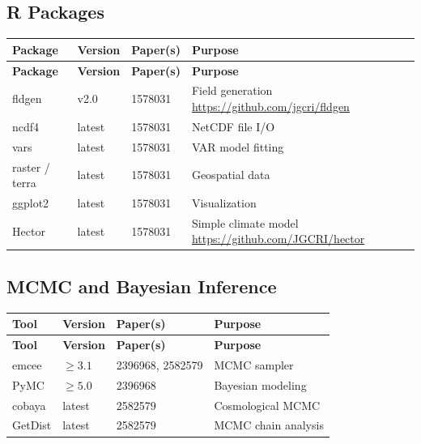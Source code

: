 \documentclass[11pt,a4paper]{article}
\begin{document}
\subsection{R Packages}

\begin{longtable}{p{3.5cm} p{2cm} p{3cm} p{5cm}}
\toprule
\textbf{Package} & \textbf{Version} & \textbf{Paper(s)} & \textbf{Purpose} \\
\midrule
\endfirsthead
\toprule
\textbf{Package} & \textbf{Version} & \textbf{Paper(s)} & \textbf{Purpose} \\
\midrule
\endhead
fldgen & v2.0 & 1578031 & Field generation \newline \url{https://github.com/jgcri/fldgen} \\
\midrule
ncdf4 & latest & 1578031 & NetCDF file I/O \\
\midrule
vars & latest & 1578031 & VAR model fitting \\
\midrule
raster / terra & latest & 1578031 & Geospatial data \\
\midrule
ggplot2 & latest & 1578031 & Visualization \\
\midrule
Hector & latest & 1578031 & Simple climate model \newline \url{https://github.com/JGCRI/hector} \\
\bottomrule
\end{longtable}


\subsection{MCMC and Bayesian Inference}

\begin{longtable}{p{3.5cm} p{2cm} p{3cm} p{5cm}}
\toprule
\textbf{Tool} & \textbf{Version} & \textbf{Paper(s)} & \textbf{Purpose} \\
\midrule
\endfirsthead
\toprule
\textbf{Tool} & \textbf{Version} & \textbf{Paper(s)} & \textbf{Purpose} \\
\midrule
\endhead
emcee & $\geq 3.1$ & 2396968, 2582579 & MCMC sampler \\
\midrule
PyMC & $\geq 5.0$ & 2396968 & Bayesian modeling \\
\midrule
cobaya & latest & 2582579 & Cosmological MCMC \\
\midrule
GetDist & latest & 2582579 & MCMC chain analysis \\
\bottomrule
\end{longtable}
\end{document}
